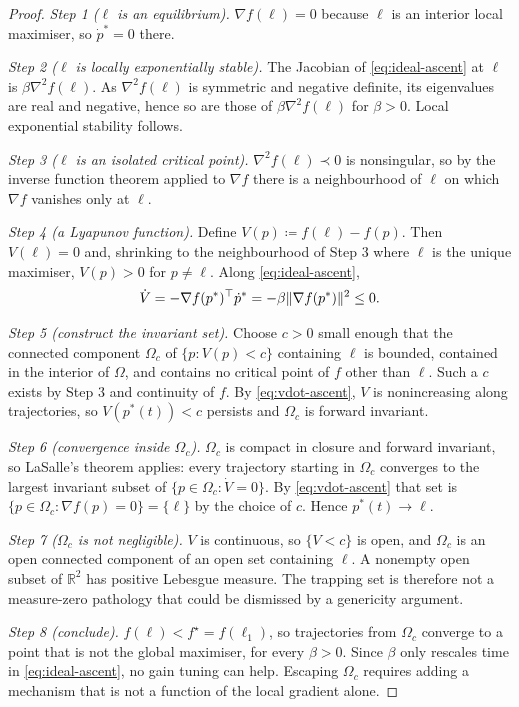 \documentclass[11pt,a4paper]{article}
\theoremstyle{plain}
\theoremstyle{definition}
\newcommand{\R}{\mathbb{R}}
\DeclarePairedDelimiter{\norm}{\lVert}{\rVert}
\begin{document}
\begin{proof}
\emph{Step 1 ($\ell$ is an equilibrium).} $\nabla f(\ell)=0$ because $\ell$ is an interior local
maximiser, so $\dot p^*=0$ there.

\emph{Step 2 ($\ell$ is locally exponentially stable).} The Jacobian of
\eqref{eq:ideal-ascent} at $\ell$ is $\beta\nabla^2f(\ell)$. As $\nabla^2f(\ell)$ is symmetric
and negative definite, its eigenvalues are real and negative, hence so are those of
$\beta\nabla^2f(\ell)$ for $\beta>0$. Local exponential stability follows.

\emph{Step 3 ($\ell$ is an isolated critical point).} $\nabla^2f(\ell)\prec0$ is nonsingular, so
by the inverse function theorem applied to $\nabla f$ there is a neighbourhood of $\ell$ on which
$\nabla f$ vanishes only at $\ell$.

\emph{Step 4 (a Lyapunov function).} Define $V(p)\coloneqq f(\ell)-f(p)$. Then $V(\ell)=0$ and,
shrinking to the neighbourhood of Step 3 where $\ell$ is the unique maximiser, $V(p)>0$ for
$p\neq\ell$. Along \eqref{eq:ideal-ascent},
\begin{equation}\label{eq:vdot-ascent}
    \dot V=-\nabla f(p^*)^{\top}\dot p^*
    =-\beta\norm{\nabla f(p^*)}^2\leq0 .
\end{equation}

\emph{Step 5 (construct the invariant set).} Choose $c>0$ small enough that the connected
component $\Omega_c$ of $\{p:V(p)<c\}$ containing $\ell$ is bounded, contained in the interior of
$\Omega$, and contains no critical point of $f$ other than $\ell$. Such a $c$ exists by Step 3
and continuity of $f$. By \eqref{eq:vdot-ascent}, $V$ is nonincreasing along trajectories, so
$V(p^*(t))<c$ persists and $\Omega_c$ is forward invariant.

\emph{Step 6 (convergence inside $\Omega_c$).} $\Omega_c$ is compact in closure and forward
invariant, so LaSalle's theorem applies: every trajectory starting in $\Omega_c$ converges to the
largest invariant subset of $\{p\in\Omega_c:\dot V=0\}$. By \eqref{eq:vdot-ascent} that set is
$\{p\in\Omega_c:\nabla f(p)=0\}=\{\ell\}$ by the choice of $c$. Hence $p^*(t)\to\ell$.

\emph{Step 7 ($\Omega_c$ is not negligible).} $V$ is continuous, so $\{V<c\}$ is open, and
$\Omega_c$ is an open connected component of an open set containing $\ell$. A nonempty open
subset of $\R^2$ has positive Lebesgue measure. The trapping set is therefore not a measure-zero
pathology that could be dismissed by a genericity argument.

\emph{Step 8 (conclude).} $f(\ell)<f^\star=f(\ell_1)$, so trajectories from $\Omega_c$ converge
to a point that is not the global maximiser, for every $\beta>0$. Since $\beta$ only rescales
time in \eqref{eq:ideal-ascent}, no gain tuning can help. Escaping $\Omega_c$ requires adding a
mechanism that is not a function of the local gradient alone.
\end{proof}
\end{document}

